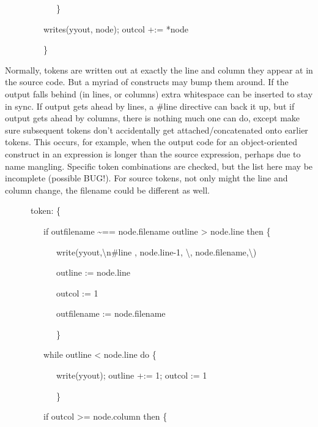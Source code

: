 {\ttfamily\mdseries
\ \ \ \ \ \ \ \ \ \ \ \ \}}

{\ttfamily\mdseries
\ \ \ \ \ \ \ \ \ writes(yyout, node); outcol +:= *node}

{\ttfamily\mdseries
\ \ \ \ \ \ \ \ \ \}}


{\textquotedbl}Normally{\textquotedbl}, tokens are written out at
exactly the line and column they appear at in the source code. But a
myriad of constructs may bump them around. If the output falls behind
(in lines, or columns) extra whitespace can be inserted to stay in
sync. If output gets ahead by lines, a \#line directive can back it
up, but if output gets ahead by columns, there is nothing much one can
do, except make sure subsequent tokens don't accidentally get
attached/concatenated onto earlier tokens. This occurs, for example,
when the output code for an object-oriented construct in an expression
is longer than the source expression, perhaps due to name
mangling. Specific token combinations are checked, but the list here
may be incomplete (possible BUG!). For source tokens, not only might
the line and column change, the filename could be different as well.

{\ttfamily\mdseries
\ \ \ \ \ \ {\textquotedbl}token{\textquotedbl}: \{}

{\ttfamily\mdseries
\ \ \ \ \ \ \ \ \ if outfilename \~{}== node.filename {\textbar} outline {\textgreater} node.line then \{}

{\ttfamily\mdseries
\ \ \ \ \ \ \ \ \ \ \ \ write(yyout,{\textquotedbl}{\textbackslash}n\#line {\textquotedbl}, node.line-1,{\textquotedbl}
{\textbackslash}{\textquotedbl}{\textquotedbl},
node.filename,{\textquotedbl}{\textbackslash}{\textquotedbl}{\textquotedbl})}

{\ttfamily\mdseries
\ \ \ \ \ \ \ \ \ \ \ \ outline := node.line}

{\ttfamily\mdseries
\ \ \ \ \ \ \ \ \ \ \ \ outcol := 1}

{\ttfamily\mdseries
\ \ \ \ \ \ \ \ \ \ \ \ outfilename := node.filename}

{\ttfamily\mdseries
\ \ \ \ \ \ \ \ \ \ \ \ \}}

{\ttfamily\mdseries
\ \ \ \ \ \ \ \ \ while outline {\textless} node.line do \{}

{\ttfamily\mdseries
\ \ \ \ \ \ \ \ \ \ \ \ write(yyout); outline +:= 1; outcol := 1}

{\ttfamily\mdseries
\ \ \ \ \ \ \ \ \ \ \ \ \}}

{\ttfamily\mdseries
\ \ \ \ \ \ \ \ \ if outcol {\textgreater}= node.column then \{}

